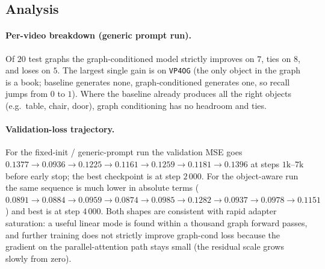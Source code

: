 \documentclass[11pt]{article}
\begin{document}
\subsection{Analysis}

\paragraph{Per-video breakdown (generic prompt run).}
Of $20$ test graphs the graph-conditioned model strictly improves on
$7$, ties on $8$, and loses on $5$. The largest single gain is on
\texttt{VP4OG} (the only object in the graph is a book; baseline
generates none, graph-conditioned generates one, so recall jumps from
$0$ to $1$). Where the baseline already produces all the right objects
(e.g.\ table, chair, door), graph conditioning has no headroom and ties.

\paragraph{Validation-loss trajectory.}
For the fixed-init / generic-prompt run the validation MSE goes
$0.1377 \to 0.0936 \to 0.1225 \to 0.1161 \to 0.1259 \to 0.1181 \to
0.1396$ at steps $1\text{k}$--$7\text{k}$ before early stop; the best
checkpoint is at step $2\,000$. For the object-aware run the same
sequence is much lower in absolute terms ($0.0891 \to 0.0884 \to
0.0959 \to 0.0874 \to 0.0985 \to 0.1282 \to 0.0937 \to 0.0978 \to
0.1151$) and best is at step $4\,000$. Both shapes are consistent with
rapid adapter saturation: a useful linear mode is found within a
thousand graph forward passes, and further training does not strictly
improve graph-cond loss because the gradient on the parallel-attention
path stays small (the residual scale grows slowly from zero).
\end{document}

